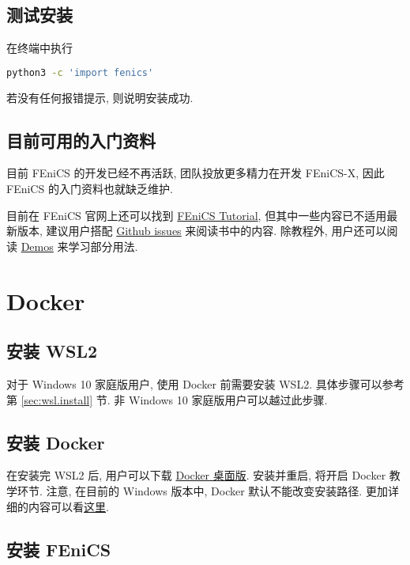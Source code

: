 \documentclass[fontset=founder]{ctexrep}
\begin{document}
\section{测试安装}

在终端中执行
\begin{lstlisting}[language = bash]
  python3 -c 'import fenics'
\end{lstlisting}
若没有任何报错提示,
则说明安装成功.

\section{目前可用的入门资料}

目前 FEniCS 的开发已经不再活跃,
团队投放更多精力在开发 FEniCS-X,
因此 FEniCS 的入门资料也就缺乏维护.

目前在 FEniCS 官网上还可以找到
\href{https://fenicsproject.org/tutorial/}{FEniCS Tutorial},
但其中一些内容已不适用最新版本,
建议用户搭配 \href{https://github.com/hplgit/fenics-tutorial/issues}{Github issues}
来阅读书中的内容.
除教程外,
用户还可以阅读
\href{https://fenicsproject.org/olddocs/dolfin/latest/python/demos.html}{Demos}
来学习部分用法.

\chapter{Docker}

\section{安装 WSL2}

对于 Windows 10 家庭版用户,
使用 Docker 前需要安装 WSL2.
具体步骤可以参考第 \ref{sec:wsl.install} 节.
非 Windows 10 家庭版用户可以越过此步骤.

\section{安装 Docker}

在安装完 WSL2 后,
用户可以下载 \href{https://www.docker.com/get-started}{Docker 桌面版}.
安装并重启,
将开启 Docker 教学环节.
注意,
在目前的 Windows 版本中,
Docker 默认不能改变安装路径.
更加详细的内容可以看\href{https://docs.docker.com/desktop/windows/install/}{这里}.

\section{安装 FEniCS}
\end{document}
